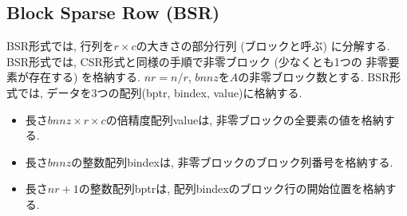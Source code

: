 \documentclass[a4paper]{jarticle}
\begin{document}
{{\newpage
\subsection{Block Sparse Row (BSR)}
BSR形式では, 行列を$r \times c$の大きさの部分行列 (ブロックと呼ぶ) に分解する. 
BSR形式では, CSR形式と同様の手順で非零ブロック (少なくとも1つの
非零要素が存在する) を格納する. 
$nr=n/r$, $bnnz$を$A$の非零ブロック数とする. 
BSR形式では, データを3つの配列({\ttfamily bptr, bindex, value})に格納する. 
\begin{itemize}
\item 長さ$bnnz \times r \times c$の倍精度配列{\ttfamily value}は, 非零ブロックの全要素の値を格納する. 
\item 長さ$bnnz$の整数配列{\ttfamily bindex}は, 非零ブロックのブロック列番号を格納する. 
\item 長さ$nr+1$の整数配列{\ttfamily bptr}は, 配列{\ttfamily bindex}のブロック行の開始位置を格納する. 
\end{itemize}

}}
\end{document}
